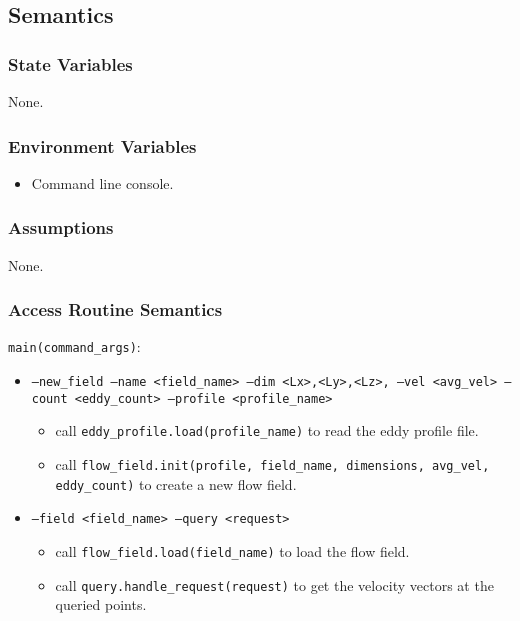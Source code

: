 \documentclass[12pt, titlepage]{article}
\begin{document}
\subsection{Semantics}

\subsubsection{State Variables}
None.

\subsubsection{Environment Variables}
\begin{itemize}
  \item Command line console.
\end{itemize}

\subsubsection{Assumptions}
None.

\subsubsection{Access Routine Semantics}

\noindent \texttt{main(command\_args)}:
\begin{itemize}
\item \texttt{--new\_field --name <field\_name> --dim <Lx>,<Ly>,<Lz>, --vel <avg\_vel> --count <eddy\_count> --profile <profile\_name>} 
  \begin{itemize}
    \item call \texttt{eddy\_profile.load(profile\_name)} to read the eddy profile file.
    \item call \texttt{flow\_field.init(profile, field\_name, dimensions, avg\_vel, eddy\_count)} to create a new flow field.
  \end{itemize}
\item \texttt{--field <field\_name> --query <request>}
  \begin{itemize}
    \item call \texttt{flow\_field.load(field\_name)} to load the flow field.
    \item call \texttt{query.handle\_request(request)} to get the velocity vectors at the queried points.
  \end{itemize}
\end{itemize}
\end{document}
